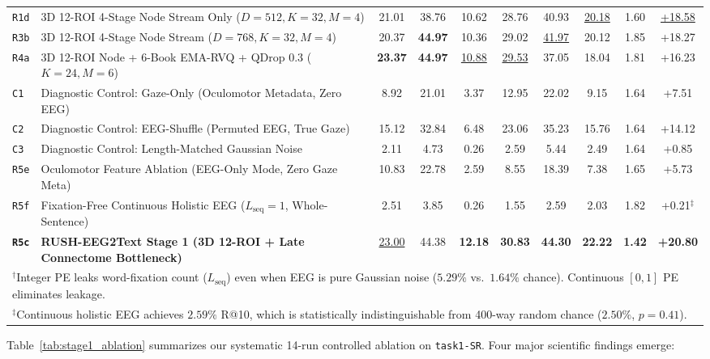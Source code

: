 \documentclass[journal]{IEEEtran}
\begin{document}
\begin{table}[t]
{\begin{tabular}{l l c c c c c c c c}
\texttt{R1d} & 3D 12-ROI 4-Stage Node Stream Only ($D=512, K=32, M=4$) & 21.01 & 38.76 & 10.62 & 28.76 & 40.93 & \underline{20.18} & 1.60 & \underline{+18.58} \\
\texttt{R3b} & 3D 12-ROI 4-Stage Node Stream ($D=768, K=32, M=4$) & 20.37 & \textbf{44.97} & 10.36 & 29.02 & \underline{41.97} & 20.12 & 1.85 & +18.27 \\
\texttt{R4a} & 3D 12-ROI Node + 6-Book EMA-RVQ + QDrop 0.3 ($K=24, M=6$) & \textbf{23.37} & \textbf{44.97} & \underline{10.88} & \underline{29.53} & 37.05 & 18.04 & 1.81 & +16.23 \\
\midrule
\texttt{C1} & Diagnostic Control: Gaze-Only (Oculomotor Metadata, Zero EEG) & 8.92 & 21.01 & 3.37 & 12.95 & 22.02 & 9.15 & 1.64 & +7.51 \\
\texttt{C2} & Diagnostic Control: EEG-Shuffle (Permuted EEG, True Gaze) & 15.12 & 32.84 & 6.48 & 23.06 & 35.23 & 15.76 & 1.64 & +14.12 \\
\texttt{C3} & Diagnostic Control: Length-Matched Gaussian Noise & 2.11 & 4.73 & 0.26 & 2.59 & 5.44 & 2.49 & 1.64 & +0.85 \\
\midrule
\texttt{R5e} & Oculomotor Feature Ablation (EEG-Only Mode, Zero Gaze Meta) & 10.83 & 22.78 & 2.59 & 8.55 & 18.39 & 7.38 & 1.65 & +5.73 \\
\texttt{R5f} & Fixation-Free Continuous Holistic EEG ($L_{\text{seq}}=1$, Whole-Sentence) & 2.51 & 3.85 & 0.26 & 1.55 & 2.59 & 2.03 & 1.82 & +0.21$^\ddagger$ \\
\textbf{\texttt{R5c}} & \textbf{RUSH-EEG2Text Stage 1 (3D 12-ROI + Late Connectome Bottleneck)} & \underline{23.00} & 44.38 & \textbf{12.18} & \textbf{30.83} & \textbf{44.30} & \textbf{22.22} & \textbf{1.42} & \textbf{+20.80} \\
\bottomrule
\multicolumn{10}{l}{\footnotesize $^\dagger$Integer PE leaks word-fixation count ($L_{\text{seq}}$) even when EEG is pure Gaussian noise ($5.29\%$ vs.\ $1.64\%$ chance). Continuous $[0,1]$ PE eliminates leakage.} \\
\multicolumn{10}{l}{\footnotesize $^\ddagger$Continuous holistic EEG achieves $2.59\%$ R@10, which is statistically indistinguishable from 400-way random chance ($2.50\%$, $p=0.41$).}
\end{tabular}%
}
\end{table}

Table~\ref{tab:stage1_ablation} summarizes our systematic 14-run controlled ablation on \texttt{task1-SR}. Four major scientific findings emerge:
\end{document}
